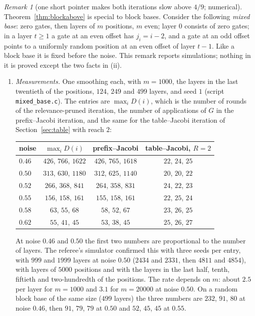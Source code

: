 \documentclass[11pt]{amsart}
\theoremstyle{definition}
\theoremstyle{remark}
\newtheorem{remark}[theorem]{Remark}
\begin{document}
\begin{remark}[one short pointer makes both iterations slow above $4/9$; numerical]\label{rem:mixed}
Theorem~\ref{thm:blockabove} is special to block bases. Consider the following \emph{mixed base}:
zero gates, then layers of $m$ positions, $m$ even; layer $0$ consists of zero gates; in a layer
$t\ge1$ a gate at an even offset has $j_i=i-2$, and a gate at an odd offset points to a
uniformly random position at an even offset of layer $t-1$. Like a block base it is fixed before
the noise. This remark reports simulations; nothing in it is proved except the two facts in (ii).
\begin{enumerate}[label=(\roman*),leftmargin=2.4em]
\item \emph{Measurements.} One smoothing each, with $m=1000$, the layers in the last twentieth of
the positions, $124$, $249$ and $499$ layers, and seed $1$ (script \texttt{mixed\_base.c}). The
entries are $\max_iD(i)$, which is the number of rounds of the relevance-pruned iteration, the
number of applications of $G$ in the prefix--Jacobi iteration, and the same for the table--Jacobi
iteration of Section~\ref{sec:table} with reach $2$:
\begin{center}
\begin{tabular}{lccc}
\toprule
noise & $\max_iD(i)$ & prefix--Jacobi & table--Jacobi, $R=2$\\
\midrule
$0.46$ & $426$, $766$, $1622$ & $426$, $765$, $1618$ & $22$, $24$, $25$\\
$0.50$ & $313$, $630$, $1180$ & $312$, $625$, $1140$ & $20$, $20$, $22$\\
$0.52$ & $266$, $368$, $841$ & $264$, $358$, $831$ & $24$, $22$, $23$\\
$0.55$ & $156$, $158$, $161$ & $155$, $158$, $161$ & $22$, $25$, $24$\\
$0.58$ & $63$, $55$, $68$ & $58$, $52$, $67$ & $23$, $26$, $25$\\
$0.62$ & $55$, $41$, $45$ & $53$, $38$, $45$ & $25$, $26$, $27$\\
\bottomrule
\end{tabular}
\end{center}
At noise $0.46$ and $0.50$ the first two numbers are proportional to the number of layers. The
referee's simulator confirmed this with three seeds per entry, with $999$ and $1999$ layers at
noise $0.50$ ($2434$ and $2331$, then $4811$ and $4854$), with layers of $5000$ positions and
with the layers in the last half, tenth, fiftieth and two-hundredth of the positions. The rate
depends on $m$: about $2.5$ per layer for $m=1000$ and $3.1$ for $m=20000$ at noise $0.50$. On a
random block base of the same size ($499$ layers) the three numbers are $232$, $91$, $80$ at
noise $0.46$, then $91$, $79$, $79$ at $0.50$ and $52$, $45$, $45$ at $0.55$.


\end{enumerate}
\end{remark}
\end{document}
